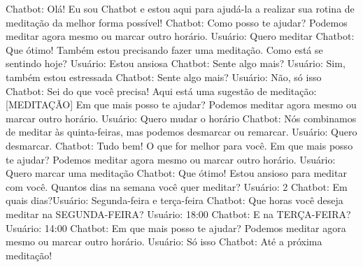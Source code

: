 Chatbot: Olá! Eu sou Chatbot e estou aqui para ajudá-la a realizar sua rotina de
meditação da melhor forma possível!
Chatbot: Como posso te ajudar? Podemos meditar agora mesmo ou marcar outro
horário.
Usuário: Quero meditar
Chatbot: Que ótimo! Também estou precisando fazer uma meditação. Como está se
sentindo hoje?
Usuário: Estou ansiosa
Chatbot: Sente algo mais?
Usuário: Sim, também estou estressada
Chatbot: Sente algo mais?
Usuário: Não, só isso
Chatbot: Sei do que você precisa! Aqui está uma sugestão de meditação:
[MEDITAÇÃO]
Em que mais posso te ajudar? Podemos meditar agora mesmo ou marcar outro
horário.
Usuário: Quero mudar o horário
Chatbot: Nós combinamos de meditar às quinta-feiras, mas podemos desmarcar ou
remarcar.
Usuário: Quero desmarcar.
Chatbot: Tudo bem! O que for melhor para você.
Em que mais posso te ajudar? Podemos meditar agora mesmo ou marcar outro
horário.
Usuário: Quero marcar uma meditação
Chatbot: Que ótimo! Estou ansioso para meditar com você.
Quantos dias na semana você quer meditar?
Usuário: 2
Chatbot: Em quais dias?Usuário: Segunda-feira e terça-feira
Chatbot: Que horas você deseja meditar na SEGUNDA-FEIRA?
Usuário: 18:00
Chatbot: E na TERÇA-FEIRA?
Usuário: 14:00
Chatbot: Em que mais posso te ajudar? Podemos meditar agora mesmo ou marcar
outro horário.
Usuário: Só isso
Chatbot: Até a próxima meditação!